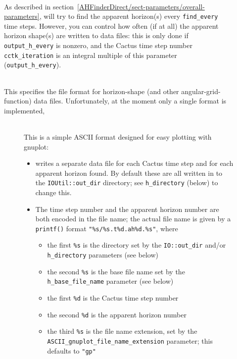 \begin{description}
\item[]
\mbox{}\\
	As described in
	section~\ref{AHFinderDirect/sect-parameters/overall-parameters},
	 will try to find the apparent horizon(s)
	every \verb|find_every| time steps.  However, you can control
	how often (if at all) the apparent horizon shape(s) are written
	to data files: this is only done if \verb|output_h_every|
	is nonzero, and the Cactus time step number \verb|cctk_iteration|
	is an integral multiple of this parameter (\verb|output_h_every|).

\item[]
\mbox{}\\
	This specifies the file format for horizon-shape (and other
	angular-grid-function) data files.  Unfortunately, at the
	moment only a single format is implemented,
	\begin{description}
	\item[]
	\mbox{}\\
		This is a simple ASCII format designed for easy
		plotting with gnuplot:
		\begin{itemize}
		\item	{} writes a separate data file
			for each Cactus time step and for each apparent
			horizon found.  By default these are all written
			in to the \verb|IOUtil::out_dir| directory;
			see \verb|h_directory| (below) to change this.
		\item	The time step number and the apparent horizon number
			are both encoded in the file name; the actual
			file name is given by a \verb|printf()| format
			\verb|"%s/%s.t%d.ah%d.%s"|, where
			\begin{itemize}
			\item	the first \verb|%s| is the directory
				set by the \verb|IO::out_dir| and/or
				\verb|h_directory| parameters (see below)
			\item	the second \verb|%s| is the base file name
				set by the \verb|h_base_file_name|
				parameter (see below)
			\item	the first \verb|%d| is the
				Cactus time step number
			\item	the second \verb|%d| is the
				apparent horizon number
			\item	the third \verb|%s| is the
				file name extension, set by the
				\verb|ASCII_gnuplot_file_name_extension|
				parameter; this defaults to \verb|"gp"|

\end{itemize}
\end{itemize}
\end{description}
\end{description}
